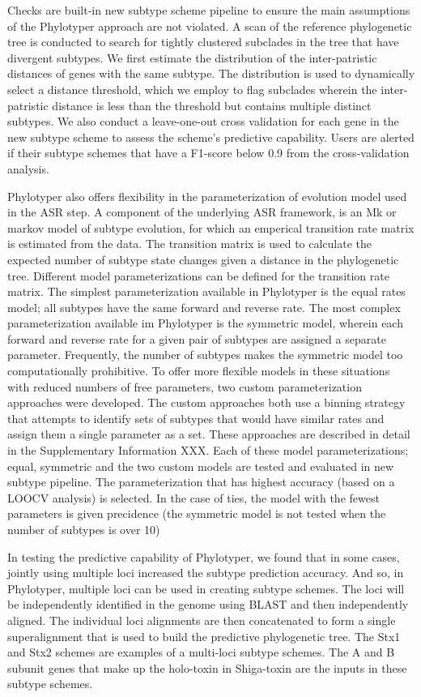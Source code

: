 \documentclass{bioinfo}
\begin{document}
Checks are built-in new subtype scheme pipeline to ensure the main assumptions of the Phylotyper approach are not violated.  
A scan of the reference phylogenetic tree is conducted to search for tightly clustered subclades in the tree that have divergent subtypes.
We first estimate the distribution of the inter-patristic distances of genes with the same subtype.  
The distribution is used to dynamically select a distance threshold, which we employ to flag subclades wherein the inter-patristic distance is less than  the threshold but contains multiple distinct subtypes.
We also conduct a leave-one-out cross validation for each gene in the new subtype scheme to assess the scheme's predictive capability.
Users are alerted if their subtype schemes that have a F1-score below 0.9 from the cross-validation analysis.

Phylotyper also offers flexibility in the parameterization of evolution model used in the ASR step.
A component of the underlying ASR framework, is an Mk or markov model of subtype evolution, for which an emperical transition rate matrix is estimated from the data.
The transition matrix is used to calculate the expected number of subtype state changes given a distance in the phylogenetic tree.  
Different model parameterizations can be defined for the transition rate matrix. 
The simplest parameterization available in Phylotyper is the equal rates model; all subtypes have the same forward and reverse rate.  
The most complex parameterization available im Phylotyper is the symmetric model, wherein each forward and reverse rate for a given pair of subtypes are assigned a separate parameter.
Frequently, the number of subtypes makes the symmetric model too computationally prohibitive.
To offer more flexible models in these situations with reduced numbers of free parameters, two custom parameterization approaches were developed.
The custom approaches both use a binning strategy that attempts to identify sets of subtypes that would have similar rates and assign them a single parameter as a set.
These approaches are described in detail in the Supplementary Information XXX.
Each of these model parameterizations; equal, symmetric and the two custom models are tested and evaluated in new subtype pipeline.
The parameterization that has highest accuracy (based on a LOOCV analysis) is selected.
In the case of ties, the model with the fewest parameters is given precidence (the symmetric model is not tested when the number of subtypes is over 10)

In testing the predictive capability of Phylotyper, we found that in some cases, jointly using multiple loci increased the subtype prediction accuracy.  
And so, in Phylotyper, multiple loci can be used in creating subtype schemes.
The loci will be independently identified in the genome using BLAST and then independently aligned.  
The individual loci alignments are then concatenated to form a single superalignment that is used to build the predictive phylogenetic tree.  
The Stx1 and Stx2 schemes are examples of a multi-loci subtype schemes.  
The A and B subunit genes that make up the holo-toxin in Shiga-toxin are the inputs in these subtype schemes.
\end{document}
